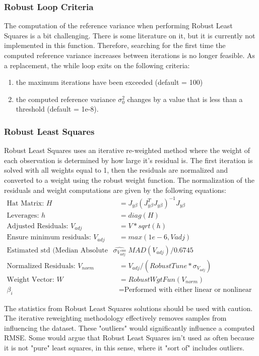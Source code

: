 \documentclass{article}
\begin{document}
	\clearpage
	\subsubsection*{Robust Loop Criteria}
	The computation of the reference variance when performing Robust Least Squares is a bit challenging.  There is some literature on it, but it is currently not implemented in this function.  Therefore, searching for the first time the computed reference variance increases between iterations is no longer feasible.  As a replacement, the while loop exits on the following criteria:
	\begin{enumerate}[label=\alph*)]
		\item the maximum iterations have been exceeded (default = 100)
		\item the computed reference variance $\sigma_0^2$ changes by a value that is less than a threshold (default = 1e-8).
	\end{enumerate}
	\subsubsection*{Robust Least Squares}
	Robust Least Squares uses an iterative re-weighted method where the weight of each observation is determined by how large it's residual is.  The first iteration is solved with all weights equal to 1, then the residuals are normalized and converted to a weight using the robust weight function.  The normalization of the residuals and weight computations are given by the following equations:
	\begin{align*}
	\text{Hat Matrix: } H &= J_{y\beta} (J_{y\beta}^TJ_{y\beta})^{-1} J_{y\beta} \\
	\text{Leverages: }h &= diag(H) \\
	\text{Adjusted Residuals: }V_{adj} &= V*sqrt(h) \\
	\text{Ensure minimum residuals: }V_{adj} &= max(1e-6,V{adj}) \\
	\text{Estimated std (Median Absolute Residuals): }\hat{\sigma_{V_{adj}}} &= MAD(V_{adj})/0.6745 \\
	\text{Normalized Residuals: }V_{norm} &= V_{adj}/(RobustTune * {\sigma_{V_{adj}}}) \\
	\text{Weight Vector: }W &= RobustWgtFun(V_{norm}) \\
	\beta_i &= \text{Performed with either linear or nonlinear least squares}
	\end{align*}
	
	The statistics from Robust Least Squares solutions should be used with caution.  The iterative reweighting methodology effectively removes samples from influencing the dataset.  These "outliers" would significantly influence a computed RMSE.  Some would argue that Robust Least Squares isn't used as often because it is not "pure" least squares, in this sense, where it "sort of" includes outliers. 
	\clearpage
\end{document}
